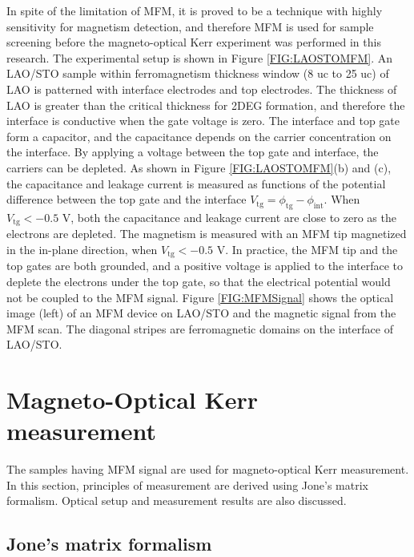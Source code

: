 \documentclass[pdflatex, sectionletters, 12pt, final, phd]{pittetd}    %
\begin{document}
In spite of the limitation of MFM, it is proved to be a technique with highly sensitivity\cite{bi2014room} for magnetism detection, and therefore MFM is used for sample screening before the magneto-optical Kerr experiment was performed in this research. The experimental setup is shown in Figure \ref{FIG:LAOSTOMFM}. An LAO/STO sample within ferromagnetism thickness window (8 uc to 25 uc) of LAO\cite{bi2015laalo3} is patterned with interface electrodes and top electrodes. The thickness of LAO is greater than the critical thickness for 2DEG formation, and therefore the interface is conductive when the gate voltage is zero. The interface and top gate form a capacitor, and the capacitance depends on the carrier concentration on the interface. By applying a voltage between the top gate and interface, the carriers can be depleted. As shown in Figure \ref{FIG:LAOSTOMFM}(b) and (c), the capacitance and leakage current is measured as functions of the potential difference between the top gate and the interface $V_\mathrm{tg} = \phi_\mathrm{tg} - \phi_\mathrm{int}$. When $V_\mathrm{tg} < -0.5$ V, both the capacitance and leakage current are close to zero as the electrons are depleted. The magnetism is measured with an MFM tip magnetized in the in-plane direction, when $V_\mathrm{tg} < -0.5$ V. In practice, the MFM tip and the top gates are both grounded, and a positive voltage is applied to the interface to deplete the electrons under the top gate, so that the electrical potential would not be coupled to the MFM signal. Figure \ref{FIG:MFMSignal} shows the optical image (left) of an MFM device on LAO/STO and the magnetic signal from the MFM scan. The diagonal stripes are ferromagnetic domains on the interface of LAO/STO.

\section{Magneto-Optical Kerr measurement}

The samples having MFM signal are used for magneto-optical Kerr measurement. In this section, principles of measurement are derived using Jone's matrix formalism. Optical setup and measurement results are also discussed.

\subsection{Jone's matrix formalism}
\end{document}
